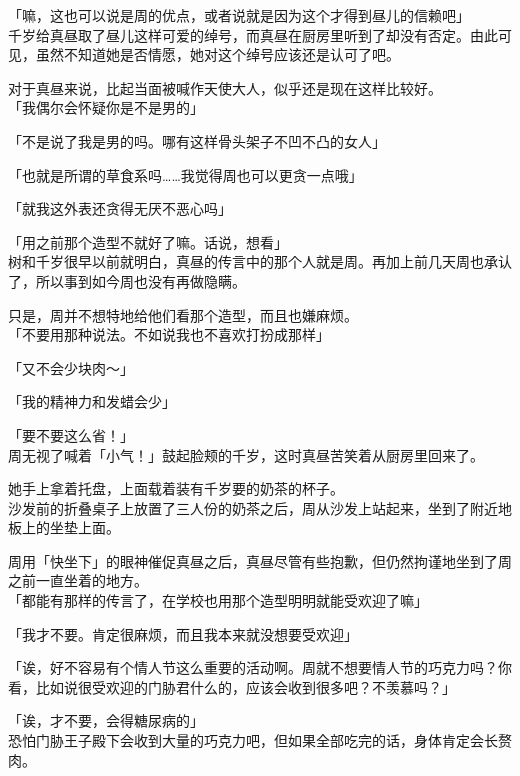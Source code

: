 「嘛，这也可以说是周的优点，或者说就是因为这个才得到昼儿的信赖吧」\\

千岁给真昼取了昼儿这样可爱的绰号，而真昼在厨房里听到了却没有否定。由此可见，虽然不知道她是否情愿，她对这个绰号应该还是认可了吧。

对于真昼来说，比起当面被喊作天使大人，似乎还是现在这样比较好。\\

「我偶尔会怀疑你是不是男的」

「不是说了我是男的吗。哪有这样骨头架子不凹不凸的女人」

「也就是所谓的草食系吗……我觉得周也可以更贪一点哦」

「就我这外表还贪得无厌不恶心吗」

「用之前那个造型不就好了嘛。话说，想看」\\

树和千岁很早以前就明白，真昼的传言中的那个人就是周。再加上前几天周也承认了，所以事到如今周也没有再做隐瞒。

只是，周并不想特地给他们看那个造型，而且也嫌麻烦。\\

「不要用那种说法。不如说我也不喜欢打扮成那样」

「又不会少块肉～」

「我的精神力和发蜡会少」

「要不要这么省！」\\

周无视了喊着「小气！」鼓起脸颊的千岁，这时真昼苦笑着从厨房里回来了。

她手上拿着托盘，上面载着装有千岁要的奶茶的杯子。\\

沙发前的折叠桌子上放置了三人份的奶茶之后，周从沙发上站起来，坐到了附近地板上的坐垫上面。

周用「快坐下」的眼神催促真昼之后，真昼尽管有些抱歉，但仍然拘谨地坐到了周之前一直坐着的地方。\\

「都能有那样的传言了，在学校也用那个造型明明就能受欢迎了嘛」

「我才不要。肯定很麻烦，而且我本来就没想要受欢迎」

「诶，好不容易有个情人节这么重要的活动啊。周就不想要情人节的巧克力吗？你看，比如说很受欢迎的门胁君什么的，应该会收到很多吧？不羡慕吗？」

「诶，才不要，会得糖尿病的」\\

恐怕门胁王子殿下会收到大量的巧克力吧，但如果全部吃完的话，身体肯定会长赘肉。\\

